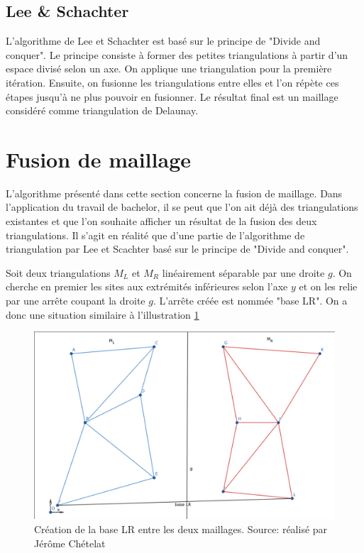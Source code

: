 \subsection{Lee \& Schachter}

L'algorithme de Lee et Schachter est basé sur le principe de "Divide and conquer".
Le principe consiste à former des petites triangulations à partir d'un espace divisé selon un axe.
On applique une triangulation pour la première itération.
Ensuite, on fusionne les triangulations entre elles et l'on répète ces étapes jusqu'à ne plus pouvoir en fusionner.
Le résultat final est un maillage considéré comme triangulation de Delaunay. 
\newpage
\section{Fusion de maillage}

L'algorithme présenté dans cette section concerne la fusion de maillage.
Dans l'application du travail de bachelor, il se peut que l'on ait déjà des triangulations existantes et que l'on souhaite afficher un résultat de la fusion des deux triangulations.
Il s'agit en réalité que d'une partie de l'algorithme de triangulation par Lee et Scachter basé sur le principe de "Divide and conquer".

Soit deux triangulations $M_L$ et $M_R$ linéairement séparable par une droite $g$.
On cherche en premier les sites aux extrémités inférieures selon l'axe $y$ et on les relie par une arrête coupant la droite $g$.
L'arrête créée est nommée "base LR". On a donc une situation similaire à l'illustration \ref{fig:base_lr}

\begin{figure}[!htb]
    \centering
    \includegraphics[width=0.8\linewidth]{figures/base_lr.png}
    \caption{Création de la base LR entre les deux maillages. Source: réalisé par Jérôme Chételat}
    \label{fig:base_lr}
\end{figure}

